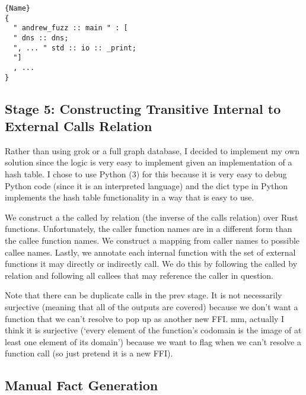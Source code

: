 \documentclass[11pt]{article}
\begin{document}
\begin{lstlisting}[caption=JSON, label=code:json]{Name}
{
  " andrew_fuzz :: main " : [
  " dns :: dns;
  ", ... " std :: io :: _print;
  "]
  , ...
}
\end{lstlisting}

\subsection{Stage 5: Constructing Transitive Internal to External Calls Relation}

Rather than using grok or a full graph database, I decided to implement my own solution since the logic is very easy to implement given an implementation of a hash table.
I chose to use Python (3) for this because it is very easy to debug Python code (since it is an interpreted language) and the dict type in Python implements the hash table functionality in a way that is easy to use.

We construct a the called by relation (the inverse of the calls relation) over Rust functions.
Unfortunately, the caller function names are in a different form than the callee function names.
We construct a mapping from caller names to possible callee names.
Lastly, we annotate each internal function with the set of external functions it may directly or indirectly call.
We do this by following the called by relation and following all callees that may reference the caller in question.

Note that there can be duplicate calls in the prev stage.
It is not necessarily surjective (meaning that all of the outputs are covered) because we don't want a function that we can't resolve to pop up as another new FFI.
mm, actually I think it is surjective (`every element of the function's codomain is the image of at least one element of its domain') because we want to flag when we can't resolve a function call (so just pretend it is a new FFI).


\subsection{Manual Fact Generation}
\end{document}
